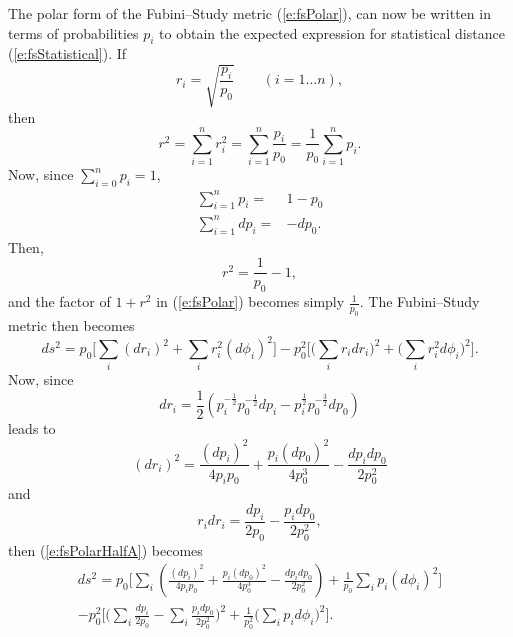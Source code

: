 The polar form of the Fubini--Study metric (\ref{e:fsPolar}),
can now be written in terms of probabilities $p_i$ to obtain the
expected expression for statistical distance (\ref{e:fsStatistical}).
If 
\begin{equation}
r_i = \sqrt{\frac{p_i}{p_0}}\qquad(i= 1\ldots n),
\end{equation}
then 
\begin{equation}
r^2 = \sum_{i=1}^{n} r_i^2 = \sum_{i=1}^{n} \frac{p_i}{p_0}
= \frac{1}{p_0}\sum_{i=1}^n p_i.
\end{equation}
Now, since $\sum_{i=0}^n p_i = 1$,
\begin{equation}
\begin{split}
\sum_{i=1}^n p_i =& 1-p_0\\
\sum_{i=1}^n dp_i =& -dp_0.
\end{split}
\end{equation}
Then,
\begin{equation}
r^2 = \frac{1}{p_0} - 1,
\end{equation}
and the factor of $1+r^2$ in (\ref{e:fsPolar}) 
becomes simply $\frac{1}{p_0}$.
The Fubini--Study metric then becomes
\begin{equation}
ds^2 = p_0 \biggl[\sum_i \left(dr_i\right)^2 + \sum_i r_i^2\left(d\phi_i\right)^2\biggr]
- p_0^2 \biggl[\biggl(\sum_i r_idr_i\biggr)^2
           + \biggl(\sum_i r_i^2d\phi_i\biggr)^2
    \biggr].
\label{e:fsPolarHalfA}
\end{equation}
Now, since
\begin{equation}
dr_i = \frac{1}{2}\left( p_i^{-\frac{1}{2}}p_0^{-\frac{1}{2}} dp_i
                        -p_i^{\frac{1}{2}}p_0^{-\frac{3}{2}} dp_0
                  \right)
\end{equation}
leads to  
\begin{equation}
(dr_i)^2 = \frac{(dp_i)^2}{4p_ip_0}
            + \frac{p_i(dp_0)^2}{4p_0^3}
            - \frac{dp_idp_0}{2p_0^2}
\end{equation}
and
\begin{equation}
r_idr_i = \frac{dp_i}{2p_0} - \frac{p_idp_0}{2p_0^2},
\end{equation}
then (\ref{e:fsPolarHalfA}) becomes
\begin{multline}
ds^2 = p_0 \biggl[
    \sum_i\left( \frac{(dp_i)^2}{4p_ip_0}
                 + \frac{p_i(dp_0)^2}{4p_0^3}
                 - \frac{dp_idp_0}{2p_0^2}
          \right) 
    + \frac{1}{p_0} \sum_i p_i\left(d\phi_i\right)^2\biggr]\\
- p_0^2 \biggl[\biggl(\sum_i\frac{dp_i}{2p_0} 
                      - \sum_i\frac{p_idp_0}{2p_0^2}
               \biggr)^2
           + \frac{1}{p_0^2}\biggl(\sum_i p_id\phi_i\biggr)^2
    \biggr].
\end{multline}
